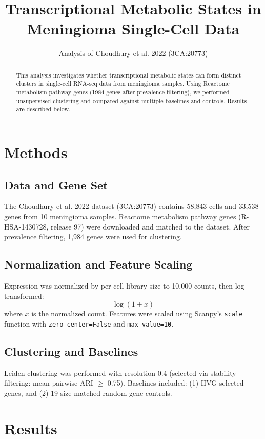 \documentclass[11pt,a4paper]{article}
\title{\textbf{Transcriptional Metabolic States in Meningioma Single-Cell Data}}
\author{Analysis of Choudhury et al. 2022 (3CA:20773)}
\date{}
\begin{document}
\sloppy

\maketitle

\begin{abstract}
This analysis investigates whether transcriptional metabolic states can form distinct clusters in single-cell RNA-seq data from meningioma samples. Using Reactome metabolism pathway genes (1984 genes after prevalence filtering), we performed unsupervised clustering and compared against multiple baselines and controls. Results are described below.
\end{abstract}

\section{Methods}

\subsection{Data and Gene Set}
The Choudhury et al. 2022 dataset (3CA:20773) contains 58,843 cells and 33,538 genes from 10 meningioma samples. Reactome metabolism pathway genes (R-HSA-1430728, release 97) were downloaded and matched to the dataset. After prevalence filtering, 1,984 genes were used for clustering.

\subsection{Normalization and Feature Scaling}
Expression was normalized by per-cell library size to 10,000 counts, then log-transformed:
\begin{equation}
\label{eq:log1p}
\log(1 + x)
\end{equation}
where $x$ is the normalized count. Features were scaled using Scanpy's \texttt{scale} function with \texttt{zero_center=False} and \texttt{max_value=10}.

\subsection{Clustering and Baselines}
Leiden clustering was performed with resolution 0.4 (selected via stability filtering: mean pairwise ARI $\ge$ 0.75). Baselines included: (1) HVG-selected genes, and (2) 19 size-matched random gene controls.

\section{Results}
\end{document}
